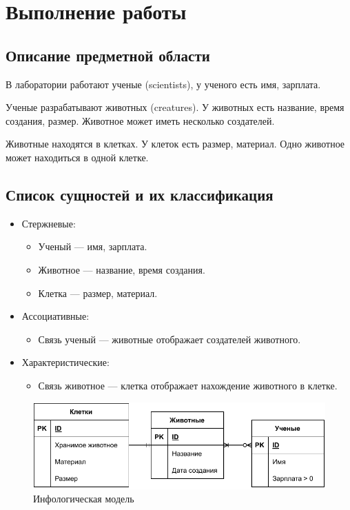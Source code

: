 \section{Выполнение работы}
\subsection{Описание предметной области}
В лаборатории работают ученые (scientists),
у ученого есть имя, зарплата.

Ученые разрабатывают животных (creatures).
У животных есть название, время создания, размер.
Животное может иметь несколько создателей.

Животные находятся в клетках.
У клеток есть размер, материал.
Одно животное может находиться в одной клетке.

\subsection{Список сущностей и их классификация}
\begin{itemize}
    \item Стержневые:
          \begin{itemize}
              \item Ученый --- имя, зарплата.
              \item Животное --- название, время создания.
              \item Клетка --- размер, материал.
          \end{itemize}
    \item Ассоциативные:
          \begin{itemize}
            \item Связь ученый --- животные отображает создателей животного.
          \end{itemize}
    \item Характеристические:
          \begin{itemize}
            \item Связь животное --- клетка отображает нахождение животного в клетке.
          \end{itemize}
\end{itemize}


\begin{figure}[ht]
    \centering
    \includegraphics[width=\textwidth]{img/infological.pdf}
    \caption{Инфологическая модель}
\end{figure}


